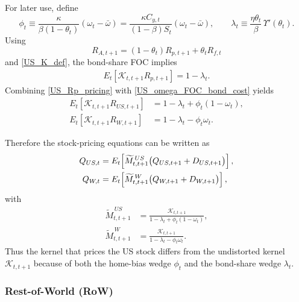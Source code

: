 \documentclass[12pt]{article}
\theoremstyle{plain}
\begin{document}
For later use, define
\[
\phi_t
\equiv
\frac{\kappa}{\beta(1-\theta_t)}(\omega_t-\bar\omega)
=
\frac{\kappa C_{y,t}}{(1-\beta)S_t}(\omega_t-\bar\omega),
\qquad
\lambda_t
\equiv
\frac{\eta\theta_t}{\beta}\,\Upsilon'(\theta_t).
\]
Using
\[
R_{A,t+1}=(1-\theta_t)R_{p,t+1}+\theta_t R_{f,t}
\]
and \eqref{US_K_def}, the bond-share FOC implies
\begin{align}\label{US_Rp_pricing}
E_t\!\left[\mathcal K_{t,t+1}R_{p,t+1}\right]
=
1-\lambda_t.
\end{align}
Combining \eqref{US_Rp_pricing} with \eqref{US_omega_FOC_bond_cost} yields
\begin{align}
E_t\!\left[\mathcal K_{t,t+1}R_{US,t+1}\right]
&=
1-\lambda_t+\phi_t(1-\omega_t),\label{US_RUS_pricing}\\
E_t\!\left[\mathcal K_{t,t+1}R_{W,t+1}\right]
&=
1-\lambda_t-\phi_t\omega_t.\label{US_RW_pricing}
\end{align}

Therefore the stock-pricing equations can be written as
\begin{align}
Q_{US,t}
&=
E_t\!\left[\widetilde M^{\,US}_{t,t+1}\bigl(Q_{US,t+1}+D_{US,t+1}\bigr)\right],\label{US_AP_bond_cost}\\
Q_{W,t}
&=
E_t\!\left[\widetilde M^{\,W}_{t,t+1}\bigl(Q_{W,t+1}+D_{W,t+1}\bigr)\right],\notag
\end{align}
with
\begin{align*}
\widetilde M^{\,US}_{t,t+1}
&=
\frac{\mathcal K_{t,t+1}}
{1-\lambda_t+\phi_t(1-\omega_t)},\\
\widetilde M^{\,W}_{t,t+1}
&=
\frac{\mathcal K_{t,t+1}}
{1-\lambda_t-\phi_t\omega_t}.
\end{align*}
Thus the kernel that prices the US stock differs from the undistorted kernel $\mathcal K_{t,t+1}$ because of
both the home-bias wedge $\phi_t$ and the bond-share wedge $\lambda_t$.

\subsubsection{Rest-of-World (RoW)}
\end{document}
